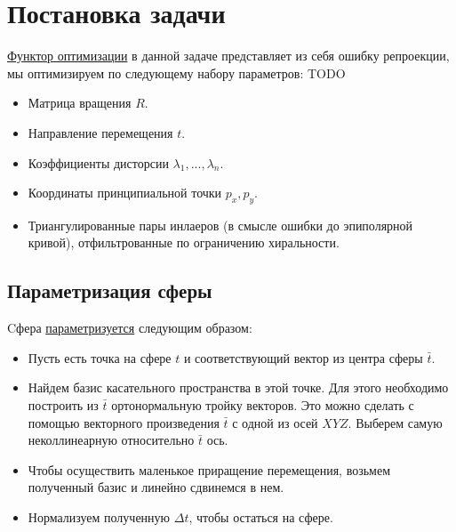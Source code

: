 \label{bundle_adj}
\section{Постановка задачи}
\href{https://github.com/QuantumMechanicus/camera_calibration_test/blob/dev/subroutines/global_non_linear_optimizer/Global_Non_Linear_Estimator.h#L30}{Функтор оптимизации} в данной задаче представляет из себя ошибку репроекции, мы оптимизируем по следующему набору параметров: TODO
\begin{itemize}
	\item Матрица вращения $R$.
	\item Направление перемещения $t$.
	\item Коэффициенты дисторсии $\lambda_1,...,\lambda_n$.
	\item Координаты принципиальной точки $p_x, p_y$.
	\item Триангулированные пары инлаеров (в смысле ошибки до эпиполярной кривой), отфильтрованные по ограничению хиральности.
\end{itemize}	 
\subsection{Параметризация сферы}
Cфера \href{https://github.com/QuantumMechanicus/camera_calibration_test/blob/dev/core/utils/Local_Parametrization_Sphere.h}{параметризуется} следующим образом:
\begin{itemize}
	\item Пусть есть точка на сфере $t$ и соответствующий вектор из центра сферы $\bar{t}$.
	\item Найдем базис касательного пространства в этой точке. Для этого необходимо построить из $\bar{t}$ ортонормальную тройку векторов. Это можно сделать с помощью векторного произведения $\bar{t}$ с одной из осей $XYZ$. Выберем самую неколлинеарную относительно $\bar{t}$ ось. 
	\item Чтобы осуществить маленькое приращение перемещения, возьмем полученный базис и линейно сдвинемся в нем.
	\item Нормализуем полученную $\Delta t$, чтобы остаться на сфере.    
\end{itemize} 
\pagebreak
